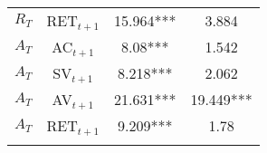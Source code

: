 \begin{table}[!htbp]
\begin{adjustbox}{center,max height=\totalheight}
\begin{tabular}{cccc}
$R_{T}$ & RET$_{t+1}$ & 15.964*** & 3.884 \\
$A_{T}$ & AC$_{t+1}$ & 8.08*** & 1.542 \\
$A_{T}$ & SV$_{t+1}$ & 8.218*** & 2.062 \\
$A_{T}$ & AV$_{t+1}$ & 21.631*** & 19.449*** \\
$A_{T}$ & RET$_{t+1}$ & 9.209*** & 1.78\\
			  \hline\\
		\end{tabular}
	\end{adjustbox}
%		
\end{table}